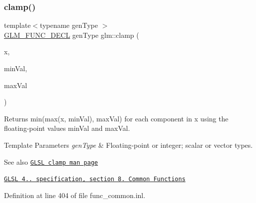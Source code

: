 \mbox{\label{group__core__func__common_ga72e9e213c84f06a329a2a838b51200f4}} 
\subsubsection{\texorpdfstring{clamp()}{clamp()}\hspace{0.1cm}{\footnotesize\ttfamily [1/2]}}
{\footnotesize\ttfamily template$<$typename gen\+Type $>$ \\
\hyperlink{setup_8hpp_ab2d052de21a70539923e9bcbf6e83a51}{G\+L\+M\+\_\+\+F\+U\+N\+C\+\_\+\+D\+E\+CL} gen\+Type glm\+::clamp (\begin{DoxyParamCaption}\item[{gen\+Type const \&}]{x,  }\item[{gen\+Type const \&}]{min\+Val,  }\item[{gen\+Type const \&}]{max\+Val }\end{DoxyParamCaption})}

Returns min(max(x, min\+Val), max\+Val) for each component in x using the floating-\/point values min\+Val and max\+Val.


\begin{DoxyTemplParams}{Template Parameters}
{\em gen\+Type} & Floating-\/point or integer; scalar or vector types.\\
\hline
\end{DoxyTemplParams}
\begin{DoxySeeAlso}{See also}
\href{http://www.opengl.org/sdk/docs/manglsl/xhtml/clamp.xml}{\tt G\+L\+SL clamp man page} 

\href{http://www.opengl.org/registry/doc/GLSLangSpec.4.20.8.pdf}{\tt G\+L\+SL 4.. specification, section 8. Common Functions} 
\end{DoxySeeAlso}


Definition at line 404 of file func\+\_\+common.\+inl.

\mbox{\label{group__core__func__common_ga5409c55a5f3aaae3e02ed440a47380bb}} 
